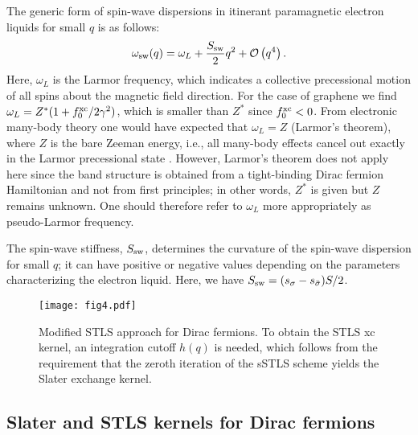 \documentclass[aps,prb,twocolumn,superscriptaddress]{revtex4-2}
\newcommand{\si}{\sigma}
\newcommand{\sib}{{\bar{\sigma}}}
\newcommand{\bigO}{\mathcal{O}}
\newcommand{\w}{\omega}
\begin{document}
The generic form of spin-wave dispersions in itinerant paramagnetic electron liquids for small $q$ is as follows:
\begin{equation}
  \w_{\rm sw}(q) = \omega_L +\frac{S_{\rm sw}}{2} q^2 +\bigO\left(q^4\right).
\end{equation}
Here, $\omega_L$ is the Larmor frequency, which indicates a collective precessional motion of all spins about the magnetic field direction.
For the case of graphene we find $\omega_L = Z^*(1 + f_0^{\rm xc}/2\gamma^2)$, which is smaller than $Z^*$ since $f_0^{\rm xc}<0$.
From electronic many-body theory one would have expected that $\omega_L = Z$ (Larmor's theorem), where $Z$ is the bare Zeeman energy, i.e., all many-body effects
cancel out exactly in the Larmor precessional state \cite{DAmico2019}. However, Larmor's theorem does not apply here since the band structure is
obtained from a tight-binding Dirac fermion Hamiltonian and not from first principles; in other words, $Z^*$ is given but $Z$ remains unknown.
One should therefore refer to $\omega_L$ more appropriately as pseudo-Larmor frequency.

The spin-wave stiffness, $S_{\rm sw}$, determines the curvature of the spin-wave dispersion
for small $q$; it can have positive or negative values depending on the parameters characterizing the electron liquid.
Here, we have  $S_{\rm sw} = (s_\si - s_\sib)S/2$.

\begin{figure}
  \texttt{[image: fig4.pdf]}
  \caption{Modified STLS approach for Dirac fermions. To obtain the STLS xc kernel, an integration cutoff $h(q)$ is needed,
  which follows from the requirement that the zeroth iteration of the sSTLS scheme yields the Slater exchange kernel.}
  \label{fig:STLSscheme}
\end{figure}

\subsection{Slater and STLS kernels for Dirac fermions}\label{sec3D}
\end{document}
